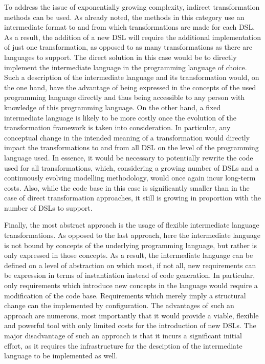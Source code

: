 To address the issue of exponentially growing complexity, indirect transformation methods can be used. As already noted, the methods in this category use an intermediate format to and from which transformations are made for each DSL. As a result, the addition of a new DSL will require the additional implementation of just one transformation, as opposed to as many transformations as there are languages to support. The direct solution in this case would be to directly implement the intermediate language in the programming language of choice. Such a description of the intermediate language and its transformation would, on the one hand, have the advantage of being expressed in the concepts of the used programming language directly and thus being accessible to any person with knowledge of this programming language. On the other hand, a fixed intermediate language is likely to be more costly once the evolution of the transformation framework is taken into consideration. In particular, any conceptual change in the intended meaning of a transformation would directly impact the transformations to and from all DSL on the level of the programming language used. In essence, it would be necessary to potentially rewrite the code used for all transformations, which, considering a growing number of DSLs and a continuously evolving modelling methodology, would once again incur long-term costs. Also, while the code base in this case is significantly smaller than in the case of direct transformation approaches, it still is growing in proportion with the number of DSLs to support.

Finally, the most abstract approach is the usage of flexible intermediate language transformations. As opposed to the last approach, here the intermediate language is not bound by concepts of the underlying programming language, but rather is only expressed in those concepts. As a result, the intermediate language can be defined on a level of abstraction on which most, if not all, new requirements can be expression in terms of instantiation instead of code generation. In particular, only requirements which introduce new concepts in the language would require a modification of the code base. Requirements which merely imply a structural change can the implemented by configuration. The advantages of such an approach are numerous, most importantly that it would provide a viable, flexible and powerful tool with only limited costs for the introduction of new DSLs. The major disadvantage of such an approach is that it incurs a significant initial effort, as it requires the infrastructure for the desciption of the intermediate language to be implemented as well.

